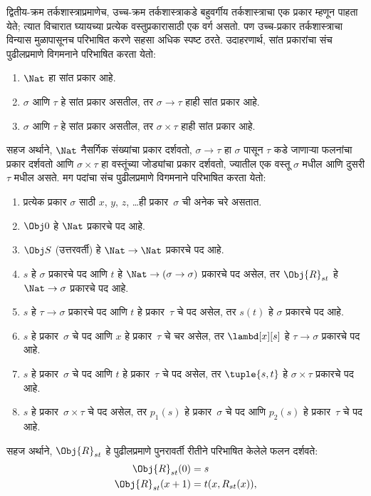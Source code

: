 \documentclass[../../../include/open-logic-section]{subfiles}
\begin{document}
द्वितीय-क्रम तर्कशास्त्राप्रमाणेच, उच्च-क्रम तर्कशास्त्राकडे बहुवर्गीय
तर्कशास्त्राचा एक प्रकार म्हणून पाहता येते; त्यात विचारात घ्यायच्या प्रत्येक
वस्तुप्रकारासाठी एक वर्ग असतो. पण उच्च-प्रकार तर्कशास्त्राचा विन्यास
मुळापासूनच परिभाषित करणे सहसा अधिक स्पष्ट ठरते. उदाहरणार्थ, सांत प्रकारांचा
संच पुढीलप्रमाणे विगमनाने परिभाषित करता येतो:
\begin{enumerate}
\item $\Nat$ हा सांत प्रकार आहे.
\item $\sigma$ आणि $\tau$ हे सांत प्रकार असतील, तर $\sigma
  \to \tau$ हाही सांत प्रकार आहे.
\item $\sigma$ आणि $\tau$ हे सांत प्रकार असतील, तर $\sigma \times
  \tau$ हाही सांत प्रकार आहे.
\end{enumerate}
सहज अर्थाने, $\Nat$ नैसर्गिक संख्यांचा प्रकार दर्शवतो, $\sigma \to \tau$
हा $\sigma$ पासून $\tau$ कडे जाणाऱ्या फलनांचा प्रकार दर्शवतो आणि
$\sigma \times \tau$ हा वस्तूंच्या जोड्यांचा प्रकार दर्शवतो, ज्यातील एक वस्तू
$\sigma$ मधील आणि दुसरी $\tau$ मधील असते. मग पदांचा संच पुढीलप्रमाणे
विगमनाने परिभाषित करता येतो:
\begin{enumerate}
\item प्रत्येक प्रकार $\sigma$ साठी $x$, $y$, $z$, \dots ही प्रकार~$\sigma$
  ची अनेक चरे असतात.
\item $\Obj 0$ हे $\Nat$ प्रकारचे पद आहे.
\item $\Obj S$ (उत्तरवर्ती) हे $\Nat \to \Nat$ प्रकारचे पद आहे.
\item $s$ हे $\sigma$ प्रकारचे पद आणि $t$ हे
  $\Nat \to (\sigma \to \sigma)$ प्रकारचे पद असेल, तर $\Obj{R}_{st}$ हे
  $\Nat \to \sigma$ प्रकारचे पद आहे.
\item $s$ हे $\tau \to \sigma$ प्रकारचे पद आणि $t$ हे प्रकार~$\tau$ चे पद
  असेल, तर $s(t)$ हे $\sigma$ प्रकारचे पद आहे.
\item $s$ हे प्रकार~$\sigma$ चे पद आणि $x$ हे प्रकार~$\tau$ चे चर असेल,
  तर $\lambd[x][s]$ हे $\tau \to \sigma$ प्रकारचे पद आहे.
\item $s$ हे प्रकार~$\sigma$ चे पद आणि $t$ हे प्रकार~$\tau$ चे पद असेल,
  तर $\tuple{s, t}$ हे $\sigma \times \tau$ प्रकारचे पद आहे.
\item $s$ हे प्रकार~$\sigma \times \tau$ चे पद असेल, तर $p_1(s)$ हे
  प्रकार~$\sigma$ चे पद आणि $p_2(s)$ हे प्रकार~$\tau$ चे पद आहे.
\end{enumerate}
सहज अर्थाने, $\Obj{R}_{st}$ हे पुढीलप्रमाणे पुनरावर्ती रीतीने परिभाषित केलेले
फलन दर्शवते:
\begin{align*}
\Obj{R}_{st}(0) & = s \\
\Obj{R}_{st}(x+1) & = t(x, R_{st}(x)),
\end{align*}
\end{document}
